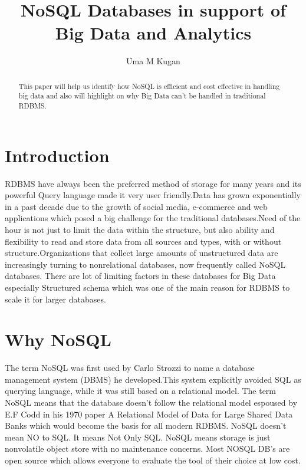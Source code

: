 \documentclass[sigconf]{acmart}
\begin{document}
\title{NoSQL Databases in support of Big Data and Analytics}

\author{Uma M Kugan}


\renewcommand{\shortauthors}{Uma}


\begin{abstract}
This paper will help us identify how NoSQL is efficient and cost effective in handling big data and also will highlight on why Big Data can't be handled in traditional RDBMS.
\end{abstract}



\maketitle

\section{Introduction}
RDBMS have always been the preferred method of storage for many years and its powerful Query language made it very user friendly.Data has grown exponentially in a past decade due to the growth of social media, e-commerce and web applications which posed a big challenge for the traditional databases.Need of the hour is not just to limit the data within the structure, but also ability and flexibility to read and store data from all sources and types, with or without structure.Organizations that collect large amounts of unstructured data are increasingly turning to nonrelational databases, now frequently called NoSQL databases.\cite{neal} There are lot of limiting factors in these databases for Big Data especially Structured schema which was one of the main reason for RDBMS to scale it for larger databases\cite{aspirenosql}.
\section{Why NoSQL}
The term NoSQL was first used by Carlo Strozzi to name a database management system (DBMS) he developed.This system explicitly avoided SQL as querying language, while it was still based on a relational model\cite{seasupenn}. The term NoSQL means that the database doesn't follow the relational model espoused by E.F Codd in his 1970 paper A Relational Model of Data for Large Shared Data Banks\cite{rdbms} which would become the basis for all modern RDBMS.  NoSQL doesn't mean NO to SQL. It means Not Only SQL. NoSQL means storage is just nonvolatile object store with no maintenance concerns. Most NOSQL DB's are open source which allows everyone to evaluate the tool of their choice at low cost.
\end{document}
